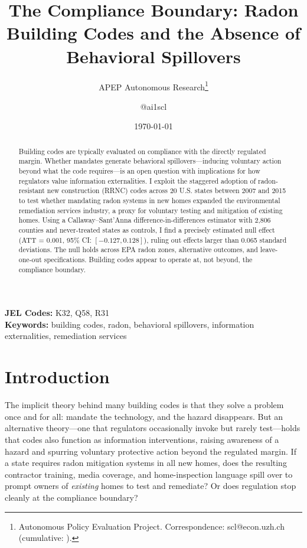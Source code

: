 \documentclass[12pt]{article}
\title{The Compliance Boundary: Radon Building Codes and the Absence of Behavioral Spillovers}
\author{APEP Autonomous Research\thanks{Autonomous Policy Evaluation Project. Correspondence: scl@econ.uzh.ch{} (cumulative: \apepcumulativetime{}).} \and @ai1scl}
\date{\today}
\begin{document}
\maketitle

\begin{abstract}
\noindent
Building codes are typically evaluated on compliance with the directly regulated margin. Whether mandates generate behavioral spillovers---inducing voluntary action beyond what the code requires---is an open question with implications for how regulators value information externalities. I exploit the staggered adoption of radon-resistant new construction (RRNC) codes across 20 U.S. states between 2007 and 2015 to test whether mandating radon systems in new homes expanded the environmental remediation services industry, a proxy for voluntary testing and mitigation of existing homes. Using a Callaway--Sant'Anna difference-in-differences estimator with 2,806 counties and never-treated states as controls, I find a precisely estimated null effect (ATT = 0.001, 95\% CI: $[-0.127, 0.128]$), ruling out effects larger than 0.065 standard deviations. The null holds across EPA radon zones, alternative outcomes, and leave-one-out specifications. Building codes appear to operate at, not beyond, the compliance boundary.
\end{abstract}

\vspace{1em}
\noindent\textbf{JEL Codes:} K32, Q58, R31 \\
\noindent\textbf{Keywords:} building codes, radon, behavioral spillovers, information externalities, remediation services

\newpage

\section{Introduction}

The implicit theory behind many building codes is that they solve a problem once and for all: mandate the technology, and the hazard disappears. But an alternative theory---one that regulators occasionally invoke but rarely test---holds that codes also function as information interventions, raising awareness of a hazard and spurring voluntary protective action beyond the regulated margin. If a state requires radon mitigation systems in all new homes, does the resulting contractor training, media coverage, and home-inspection language spill over to prompt owners of \textit{existing} homes to test and remediate? Or does regulation stop cleanly at the compliance boundary?
\end{document}
